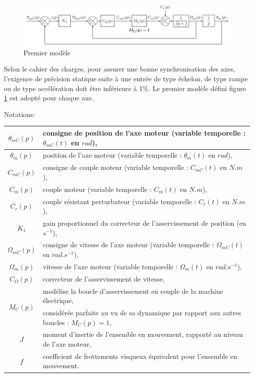 \begin{figure}[!h]
 \centering\includegraphics[width=1\linewidth]{img/fig07}
 \caption{Premier modèle}
 \label{img07}
\end{figure}

Selon le cahier des charges, pour assurer une bonne synchronisation des axes, l'exigence de précision statique
suite à une entrée de type échelon, de type rampe ou de type accélération doit être inférieure à 1\%.
Le premier modèle défini figure \ref{img07} est adopté pour chaque axe.

Notations:\\
\begin{tabular}{|c|l|}
\hline
$\theta_{mC}(p)$ &  consigne de position de l'axe moteur (variable temporelle : $\theta_{mC}(t)$ en $rad$), \\
\hline
$\theta_{m}(p)$ & position de l'axe moteur (variable temporelle : $\theta_{m}(t)$ en $rad$), \\
\hline
$C_{mC}(p)$ & consigne de couple moteur (variable temporelle : $C_{mC}(t)$ en $N.m$), \\
\hline
$C_{m}(p)$ & couple moteur (variable temporelle : $C_{m}(t)$ en $N.m$), \\
\hline
$C_{r}(p)$ & couple résistant perturbateur (variable temporelle : $C_{r}(t)$ en $N.m$), \\
\hline
$K_{1}$ & gain proportionnel du correcteur de l'asservissement de position (en $s^{-1}$), \\
\hline
$\Omega_{mC}(p)$ & consigne de vitesse de l'axe moteur (variable temporelle : $\Omega_{mC}(t)$ en $rad.s^{-1}$), \\
\hline
$\Omega_{m}(p)$ & vitesse de l'axe moteur (variable temporelle : $\Omega_{m}(t)$ en $rad.s^{-1}$), \\
\hline
$C_{\Omega}(p)$ & correcteur de l'asservissement de vitesse, \\
\hline
\multirow{2}{*}{$M_{C}(p)$} & modélise la boucle d'asservissement en couple de la machine électrique, \\
& considérée parfaite au vu de sa dynamique par rapport aux autres boucles : $M_{C}(p)=1$, \\
\hline
$J$ & moment d'inertie de l'ensemble en mouvement, rapporté au niveau de l'axe moteur, \\
\hline
$f$ & coefficient de frottements visqueux équivalent pour l'ensemble en mouvement. \\
\hline
\end{tabular}

